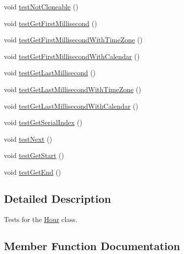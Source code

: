 \begin{DoxyCompactItemize}
\item 
void \mbox{\hyperlink{classorg_1_1jfree_1_1data_1_1time_1_1_hour_test_a8656a4df17b9b64f6ebdc60a31a82ccf}{test\+Not\+Cloneable}} ()
\item 
void \mbox{\hyperlink{classorg_1_1jfree_1_1data_1_1time_1_1_hour_test_aafae08d96b6080607a76adb4bcab8f97}{test\+Get\+First\+Millisecond}} ()
\item 
void \mbox{\hyperlink{classorg_1_1jfree_1_1data_1_1time_1_1_hour_test_a6d3c52d3f41a2ad37460633594c9af6a}{test\+Get\+First\+Millisecond\+With\+Time\+Zone}} ()
\item 
void \mbox{\hyperlink{classorg_1_1jfree_1_1data_1_1time_1_1_hour_test_ad3469b343c51128a053f5e946134b1e9}{test\+Get\+First\+Millisecond\+With\+Calendar}} ()
\item 
void \mbox{\hyperlink{classorg_1_1jfree_1_1data_1_1time_1_1_hour_test_a05024336129e08bc8365c108bff2b3b6}{test\+Get\+Last\+Millisecond}} ()
\item 
void \mbox{\hyperlink{classorg_1_1jfree_1_1data_1_1time_1_1_hour_test_a73f1f7b07de3fe96a6b56b31b0ffcfd8}{test\+Get\+Last\+Millisecond\+With\+Time\+Zone}} ()
\item 
void \mbox{\hyperlink{classorg_1_1jfree_1_1data_1_1time_1_1_hour_test_a4ac37b44021da8bbb4527cb51a078677}{test\+Get\+Last\+Millisecond\+With\+Calendar}} ()
\item 
void \mbox{\hyperlink{classorg_1_1jfree_1_1data_1_1time_1_1_hour_test_a0e8a2c646b470eb2348d9a9a60d3663e}{test\+Get\+Serial\+Index}} ()
\item 
void \mbox{\hyperlink{classorg_1_1jfree_1_1data_1_1time_1_1_hour_test_a1e7a5c633c5be30cf8de756571636c76}{test\+Next}} ()
\item 
void \mbox{\hyperlink{classorg_1_1jfree_1_1data_1_1time_1_1_hour_test_a62faa6d81e9347a2c7a1674d948308aa}{test\+Get\+Start}} ()
\item 
void \mbox{\hyperlink{classorg_1_1jfree_1_1data_1_1time_1_1_hour_test_a9977122e7bd82d7c77e3ef5f251ed178}{test\+Get\+End}} ()
\end{DoxyCompactItemize}


\subsection{Detailed Description}
Tests for the \mbox{\hyperlink{classorg_1_1jfree_1_1data_1_1time_1_1_hour}{Hour}} class. 

\subsection{Member Function Documentation}
\mbox{\label{classorg_1_1jfree_1_1data_1_1time_1_1_hour_test_ad0b7b065980738c23d2d3c1d1e0f8aa6}} 
